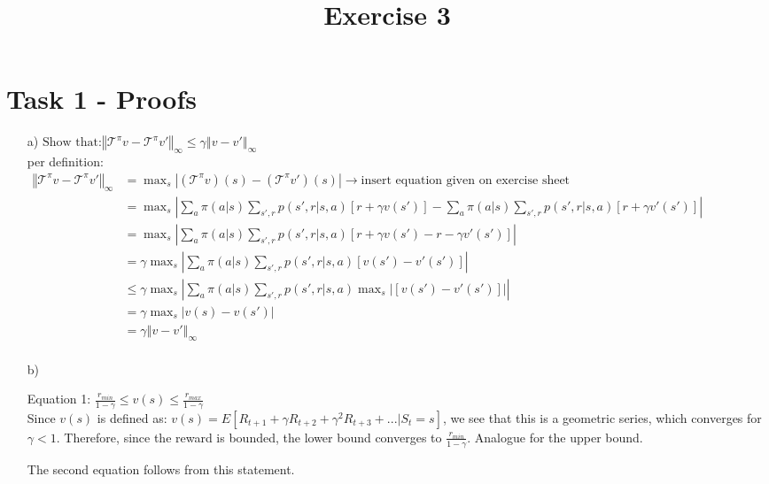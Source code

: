 \documentclass[a4paper]{article}
\date{}
\author{}
\title{\textbf{Exercise 3}}
\begin{document}
\maketitle 
\thispagestyle{fancy}

\section*{Task 1 - Proofs}

\begin{enumerate}
	\item[a)] $\text{Show that:} \left\Vert \mathcal{T}^\pi v - \mathcal{T}^\pi v' \right\Vert_\infty \leq \gamma \left \Vert v - v' \right \Vert_\infty$ \\ \linebreak
	per definition: \\
	$\begin{aligned}	
		\left\Vert \mathcal{T}^\pi v - \mathcal{T}^\pi v' \right\Vert_\infty  &= \max_s \left|(\mathcal{T}^\pi v )(s) -  (\mathcal{T}^\pi v' )(s) \right| \rightarrow \text{insert equation given on exercise sheet} \\
		&= \max_s \left| \sum_{a}\pi (a|s) \sum_{s',r}p(s',r |s,a)[r+\gamma v(s')] - \sum_{a}\pi (a|s) \sum_{s',r}p(s',r |s,a)[r+\gamma v'(s')] \right|  \\
		&= \max_s \left| \sum_{a}\pi (a|s) \sum_{s',r}p(s',r |s,a)[r+\gamma v(s') - r - \gamma v'(s')] \right| \\
		&= \gamma \max_s \left| \sum_{a}\pi (a|s) \sum_{s',r}p(s',r |s,a)[v(s') - v'(s')] \right| \\
		&\leq \gamma \max_s \left| \sum_{a}\pi (a|s) \sum_{s',r}p(s',r |s,a) \max_s \left| [v(s') - v'(s')] \right| \right| \\
		&= \gamma \max_s \left| v(s) - v(s') \right| \\
		&= \gamma \left \Vert v - v' \right \Vert_\infty \\
	\end{aligned}$
	
	\item[b)]
	
	Equation 1: $\frac{r_{min}}{1 - \gamma} \leq v(s) \leq \frac{r_{max}}{1 - \gamma}$ \\
	Since $v(s)$ is defined as: $v(s) = E[R_{t+1} + \gamma R_{t+2} + \gamma^2 R_{t+3} + ... | S_t = s]$, we see that this is a geometric series, which converges for $\gamma < 1$. 
	Therefore, since the reward is bounded, the lower bound converges to $\frac{r_{min}}{1 - \gamma}$.
	Analogue for the upper bound. 
	
	The second equation follows from this statement. 
	
	
\end{enumerate}
\end{document}
